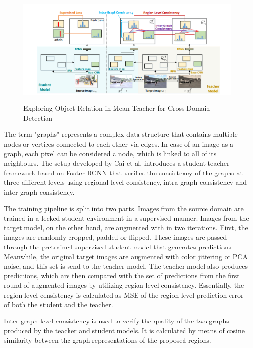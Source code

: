 \documentclass[english, 12pt, a4paper, elec, utf8, a-1b, online]{aaltothesis}
\begin{document}
\begin{figure}[htb]
	\begin{center}
		\includegraphics[width=16cm]{./graph_teacher.png}
	\end{center}
	\caption{Exploring Object Relation in Mean Teacher for Cross-Domain Detection\cite{Cai2019}}
	\begin{center}
		\label{graph_MT}
	\end{center}
\end{figure}
\FloatBarrier

The term "graphs" represents a complex data structure that contains multiple nodes or vertices connected to each other via edges. In case of an image as a graph, each pixel can be considered a node, which is linked to all of its neighbours. 
The setup developed by Cai et al. \cite{Cai2019} introduces a student-teacher framework based on Faster-RCNN that verifies the consistency of the graphs at three different levels using regional-level consistency, intra-graph consistency and inter-graph consistency. 

The training pipeline is split into two parts. Images from the source domain are trained in a locked student environment in a supervised manner. Images from the target model, on the other hand, are augmented with in two iterations. First, the images are randomly cropped, padded or flipped. These images are passed through the pretrained supervised student model that generates predictions. Meanwhile, the original target images are augmented with color jittering or PCA noise, and this set is send to the teacher model. The teacher model also produces predictions, which are then compared with the set of predictions from the first round of augmented images by utilizing region-level consistency. Essentially, the region-level consistency is calculated as MSE of the region-level prediction error of both the student and the teacher. 

Inter-graph level consistency is used to verify the quality of the two graphs produced by the teacher and student models. It is calculated by means of cosine similarity between the graph representations of the proposed regions. 
\end{document}
